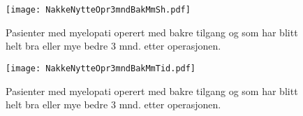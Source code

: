 \documentclass[presentation,xcolor=pdftex,dvipsnames,table]{beamer}\usepackage[]{graphicx}\usepackage[]{color}
\begin{document}
\begin{tiny}
\begin{frame}[fragile]
\begin{figure}[ht]
\centering
\texttt{[image: NakkeNytteOpr3mndBakMmSh.pdf]}
\caption{Pasienter med myelopati operert med bakre tilgang og som har blitt helt bra eller mye bedre 3 mnd. etter operasjonen. }
\end{figure}
\end{frame}

\begin{frame}[fragile]
\begin{figure}[ht]
\centering
\texttt{[image: NakkeNytteOpr3mndBakMmTid.pdf]}
\caption{Pasienter med myelopati operert med bakre tilgang og som har blitt helt bra eller mye bedre 3 mnd. etter operasjonen.}
\end{figure}
\end{frame}

\end{tiny}
\end{document}
